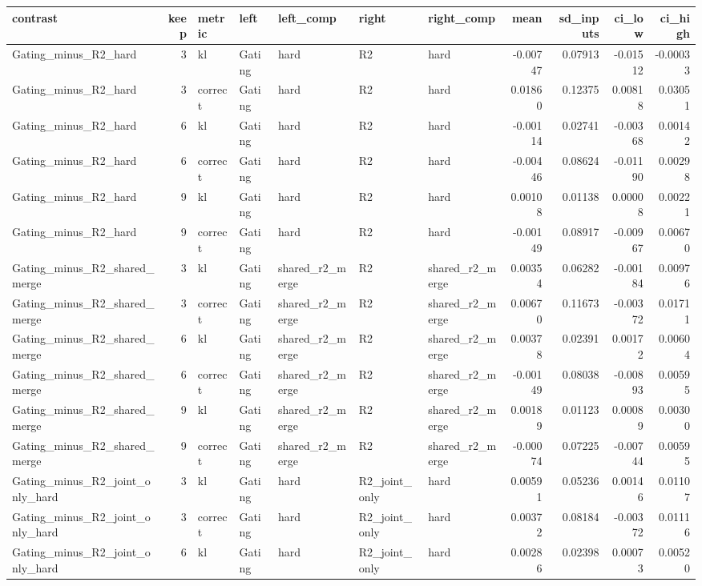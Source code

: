 \begin{tabular}{lrlllllrrrr}
\toprule
contrast & keep & metric & left & left_comp & right & right_comp & mean & sd_inputs & ci_low & ci_high \\
\midrule
Gating_minus_R2_hard & 3 & kl & Gating & hard & R2 & hard & -0.00747 & 0.07913 & -0.01512 & -0.00033 \\
Gating_minus_R2_hard & 3 & correct & Gating & hard & R2 & hard & 0.01860 & 0.12375 & 0.00818 & 0.03051 \\
Gating_minus_R2_hard & 6 & kl & Gating & hard & R2 & hard & -0.00114 & 0.02741 & -0.00368 & 0.00142 \\
Gating_minus_R2_hard & 6 & correct & Gating & hard & R2 & hard & -0.00446 & 0.08624 & -0.01190 & 0.00298 \\
Gating_minus_R2_hard & 9 & kl & Gating & hard & R2 & hard & 0.00108 & 0.01138 & 0.00008 & 0.00221 \\
Gating_minus_R2_hard & 9 & correct & Gating & hard & R2 & hard & -0.00149 & 0.08917 & -0.00967 & 0.00670 \\
Gating_minus_R2_shared_merge & 3 & kl & Gating & shared_r2_merge & R2 & shared_r2_merge & 0.00354 & 0.06282 & -0.00184 & 0.00976 \\
Gating_minus_R2_shared_merge & 3 & correct & Gating & shared_r2_merge & R2 & shared_r2_merge & 0.00670 & 0.11673 & -0.00372 & 0.01711 \\
Gating_minus_R2_shared_merge & 6 & kl & Gating & shared_r2_merge & R2 & shared_r2_merge & 0.00378 & 0.02391 & 0.00172 & 0.00604 \\
Gating_minus_R2_shared_merge & 6 & correct & Gating & shared_r2_merge & R2 & shared_r2_merge & -0.00149 & 0.08038 & -0.00893 & 0.00595 \\
Gating_minus_R2_shared_merge & 9 & kl & Gating & shared_r2_merge & R2 & shared_r2_merge & 0.00189 & 0.01123 & 0.00089 & 0.00300 \\
Gating_minus_R2_shared_merge & 9 & correct & Gating & shared_r2_merge & R2 & shared_r2_merge & -0.00074 & 0.07225 & -0.00744 & 0.00595 \\
Gating_minus_R2_joint_only_hard & 3 & kl & Gating & hard & R2_joint_only & hard & 0.00591 & 0.05236 & 0.00146 & 0.01107 \\
Gating_minus_R2_joint_only_hard & 3 & correct & Gating & hard & R2_joint_only & hard & 0.00372 & 0.08184 & -0.00372 & 0.01116 \\
Gating_minus_R2_joint_only_hard & 6 & kl & Gating & hard & R2_joint_only & hard & 0.00286 & 0.02398 & 0.00073 & 0.00520 \\

\end{tabular}
